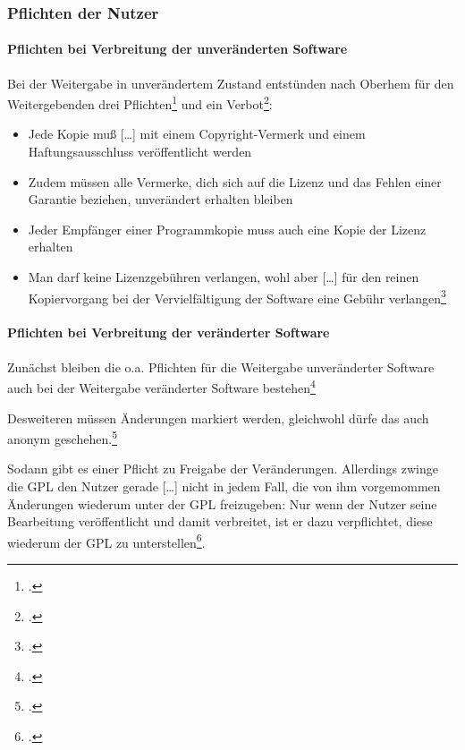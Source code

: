 \documentclass[DIV=calc,BCOR=5mm,11pt,headings=small,oneside,abstract=true, toc=bib]{scrartcl}
\begin{document}
\subsubsection{Pflichten der Nutzer}

\paragraph{Pflichten bei Verbreitung der unveränderten Software}

Bei der \glqq{}Weitergabe in unverändertem Zustand\grqq{} entstünden nach
Oberhem für den Weitergebenden drei Pflichten\footcite[vgl.][43]{Oberhem2008a}
und ein Verbot\footcite[vgl.][44]{Oberhem2008a}:

\begin{itemize}
  \item Jede Kopie muß\glqq{} [\ldots] mit einem Copyright-Vermerk und einem
  Haftungsausschluss veröffentlicht werden\glqq{}
  \item \glqq{}Zudem müssen alle Vermerke, dich sich auf die Lizenz und
  das Fehlen einer Garantie beziehen, unverändert erhalten bleiben\grqq{}
  \item Jeder Empfänger einer \glqq{}Programmkopie\grqq{} muss auch eine
  \glqq{}Kopie der Lizenz\grqq{} erhalten
  \item Man darf keine Lizenzgebühren verlangen, wohl aber 
  \glqq{}[\ldots] für den reinen Kopiervorgang bei der Vervielfältigung
  der Software eine Gebühr verlangen\grqq{}\footcite[vgl.][44]{Oberhem2008a}
\end{itemize}

\paragraph{Pflichten bei Verbreitung der veränderter Software}

Zunächst bleiben die o.a. Pflichten für die Weitergabe unveränderter Software
auch bei der Weitergabe veränderter Software
bestehen\footcite[vgl.][44]{Oberhem2008a}

Desweiteren müssen Änderungen markiert werden, gleichwohl dürfe das auch anonym
geschehen.\footcite[vgl.][44]{Oberhem2008a}

Sodann gibt es einer Pflicht zu \glqq{}Freigabe der Veränderungen\grqq{}.
Allerdings zwinge die GPL den Nutzer gerade \glqq{}[\ldots] nicht in
jedem Fall, die von ihm vorgemommen Änderungen wiederum unter der GPL
freizugeben\grqq{}: \glqq{}Nur wenn der Nutzer seine Bearbeitung
veröffentlicht und damit verbreitet, ist er dazu verpflichtet, diese
wiederum der GPL zu unterstellen\grqq{}\footcite[vgl.][45]{Oberhem2008a}.
\end{document}
